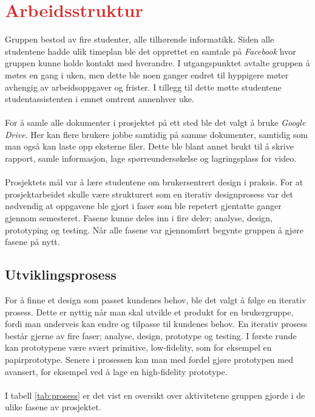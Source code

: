 \section{\textcolor[HTML]{D32F2F}{Arbeidsstruktur}}
Gruppen bestod av fire studenter, alle tilhørende informatikk. Siden alle studentene hadde ulik timeplan ble det opprettet en samtale på \textit{Facebook} hvor gruppen kunne holde kontakt med hverandre. I utgangspunktet avtalte gruppen å møtes en gang i uken, men dette ble noen ganger endret til hyppigere møter avhengig av arbeidsoppgaver og frister. I tillegg til dette møtte studentene studentassistenten i emnet omtrent annenhver uke. 
\\\\
For å samle alle dokumenter i prosjektet på ett sted ble det valgt å bruke \textit{Google Drive}. Her kan flere brukere jobbe samtidig på samme dokumenter, samtidig som man også kan laste opp eksterne filer. Dette ble blant annet brukt til å skrive rapport, samle informasjon, lage spørreundersøkelse og lagringsplass for video. 
\\\\
Prosjektets mål var å lære studentene om brukersentrert design i praksis. For at prosjektarbeidet skulle være strukturert som en iterativ designprosess var det nødvendig at oppgavene ble gjort i faser som ble repetert gjentatte ganger gjennom semesteret. Fasene kunne deles inn i fire deler; analyse, design, prototyping og testing. Når alle fasene var gjennomført begynte gruppen å gjøre fasene på nytt. 

\subsection{Utviklingsprosess}
For å finne et design som passet kundenes behov, ble det valgt å følge en iterativ prosess. Dette er nyttig når man skal utvikle et produkt for en brukergruppe, fordi man underveis kan endre og tilpasse til kundenes behov. En iterativ prosess består gjerne av fire faser; analyse, design, prototype og testing\cite{brukersentrert}. I første runde kan prototypene være svært primitive, low-fidelity, som for eksempel en papirprototype. Senere i prosessen kan man med fordel gjøre prototypen med avansert, for eksempel ved å lage en high-fidelity prototype\cite{paperprototype}.
\\\\
I tabell \ref{tab:prosess} er det vist en oversikt over aktivitetene gruppen gjorde i de ulike fasene av prosjektet.

